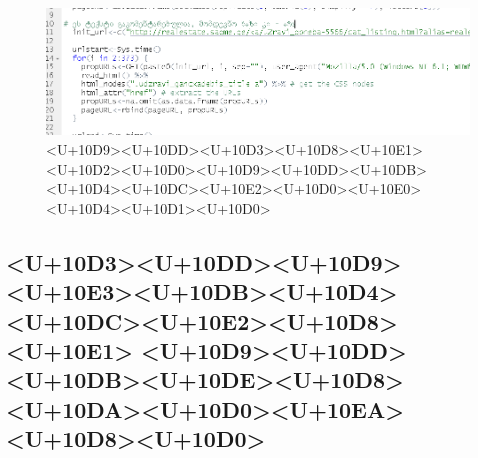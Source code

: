 \documentclass{article}
\begin{document}
\begin{figure}[h]
\centering
\includegraphics[width=\textwidth]{img/commented.PNG}
\caption{<U+10D9><U+10DD><U+10D3><U+10D8><U+10E1> <U+10D2><U+10D0><U+10D9><U+10DD><U+10DB><U+10D4><U+10DC><U+10E2><U+10D0><U+10E0><U+10D4><U+10D1><U+10D0>}
    \label{comment}
\end{figure}



\subsection*{<U+10D3><U+10DD><U+10D9><U+10E3><U+10DB><U+10D4><U+10DC><U+10E2><U+10D8><U+10E1> <U+10D9><U+10DD><U+10DB><U+10DE><U+10D8><U+10DA><U+10D0><U+10EA><U+10D8><U+10D0>}
\end{document}
